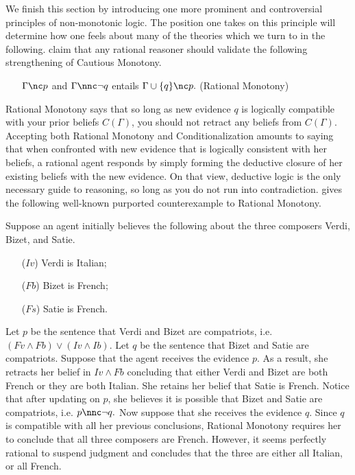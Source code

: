 We finish this section by introducing one more prominent and controversial
principles of non-monotonic logic. The position one takes on this principle will
determine how one feels about many of the theories which we turn to in the
following. \citet{kraus1990nonmonotonic} claim that any rational reasoner should
validate the following strengthening of Cautious Monotony.
\begin{itemize}
\item[] $\Gamma \nc p$ and $\Gamma \nnc \neg q$ entails $\Gamma \cup \{q\} \nc
p.$ \hfill(Rational Monotony)
\end{itemize}
Rational Monotony says that so long as new evidence $q$ is logically compatible
with your prior beliefs $C(\Gamma)$, you should not retract any beliefs from
$C(\Gamma).$ Accepting both Rational Monotony and Conditionalization amounts to
saying that when confronted with new evidence that is logically consistent with
her beliefs, a rational agent responds by simply forming the deductive closure
of her existing beliefs with the new evidence. On that view, deductive logic is
the only necessary guide to reasoning, so long as you do not run into
contradiction. \citet{stalnaker1994nonmonotonic} gives the following well-known
purported counterexample to Rational Monotony.

Suppose an agent initially believes the following about the three composers
Verdi, Bizet, and Satie.
\begin{itemize}
\item[($Iv$)] Verdi is Italian;
\item[($Fb$)] Bizet is French;
\item[($Fs$)] Satie is French.
\end{itemize}
Let $p$ be the sentence that Verdi and Bizet are compatriots, i.e. $(Fv \wedge
Fb) \vee (Iv \wedge Ib).$ Let $q$ be the sentence that Bizet and Satie are
compatriots. Suppose that the agent receives the evidence $p$. As a result, she
retracts her belief in $Iv \wedge Fb$ concluding that either Verdi and Bizet are
both French or they are both Italian. She retains her belief that Satie is
French. Notice that after updating on $p$, she believes it is possible that
Bizet and Satie are compatriots, i.e. $p \nnc \neg q.$ Now suppose that she
receives the evidence $q$. Since $q$ is compatible with all her previous
conclusions, Rational Monotony requires her to conclude that all three composers
are French. However, it seems perfectly  rational to suspend judgment and
concludes that the three are either all Italian, or all French.

